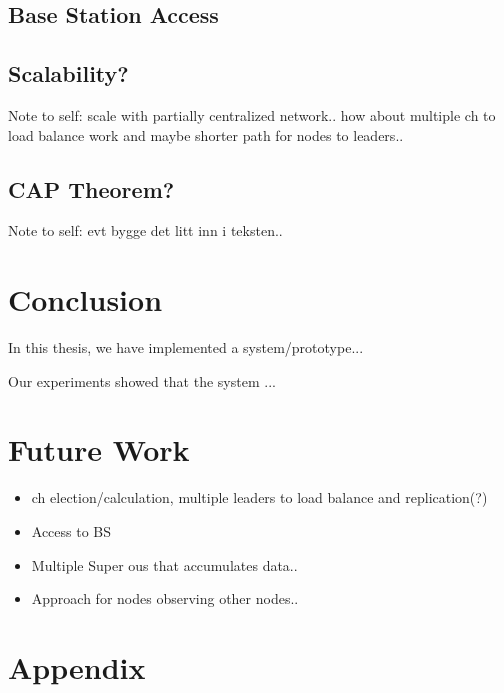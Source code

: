 \documentclass[USenglish]{uit-thesis}
\begin{document}


\section{Base Station Access}

\section{Scalability?}
Note to self: scale with partially centralized network.. how about multiple \gls{ch} to load balance work and maybe shorter path for nodes to leaders..

\section{CAP Theorem?}
Note to self: evt bygge det litt inn i teksten..


\chapter{Conclusion}
In this thesis, we have implemented a system/prototype...

Our experiments showed that the system ...


\chapter{Future Work}

\begin{itemize}
\item \gls{ch} election/calculation, multiple leaders to load balance and replication(?)
\item Access to BS
\item Multiple Super \gls{ou}s that accumulates data..
\item Approach for nodes observing other nodes..
\end{itemize}

\chapter{Appendix}
\end{document}
